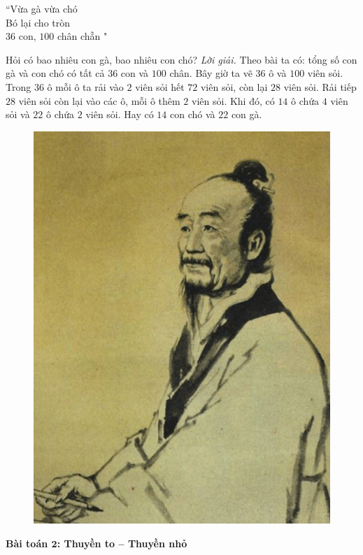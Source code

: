 \begin{multicols}{2}
\begin{center}
		``Vừa gà vừa chó\\
		Bó lại cho tròn\\
		$36$ con, $100$ chân chẵn "
	\end{center}
	Hỏi có bao nhiêu con gà, bao nhiêu con chó?
	\vskip 0.1cm
	\textit{Lời giải.}
	Theo bài ta có: tổng số con gà và con chó có tất cả $36$ con và $100$ chân.
	\vskip 0.1cm
	Bây giờ ta vẽ $36$ ô và $100$ viên sỏi. Trong $36$ ô mỗi ô ta rải vào $2$ viên sỏi hết $72$ viên sỏi, còn lại $28$ viên sỏi. Rải tiếp $28$ viên sỏi còn lại vào các ô, mỗi ô thêm $2$ viên sỏi. Khi đó, có $14$ ô chứa $4$ viên sỏi và $22$ ô chứa $2$ viên sỏi. Hay có $14$ con chó và $22$ con gà.
	\begin{figure}[H]
		\vspace*{-5pt}
		\centering
		\captionsetup{labelformat= empty, justification=centering}
		\includegraphics[width= 1\linewidth]{1}
		\vspace*{-15pt}
	\end{figure}
	\textbf{Bài toán $\pmb2$: Thuyền to -- Thuyền nhỏ}

\end{multicols}
